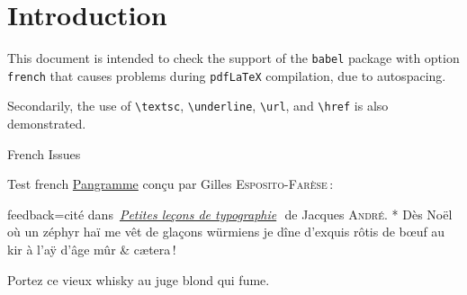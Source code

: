 \documentclass{article}
\def\myquestiontext{ \underline{Pangramme} conçu par Gilles 
  \textsc{Esposito-Farèse}:}
\def\pangramme{Dès Noël où un zéphyr haï me vêt de glaçons würmiens je dîne 
d’exquis rôtis de bœuf au kir à l’aÿ d’âge mûr \& cætera\,!}
\def\myfeedback{cité dans 
  \og\emph{\href{https://jacques-andre.fr/faqtypo/lessons.pdf}{Petites 
  leçons de typographie}}\fg\ de Jacques \textsc{André}.}
\def\myquestiontext{ \underline{Pangramme} con\c{c}u par Gilles 
  \textsc{Esposito-Far\`ese}\,:}
\def\pangramme{D\`es No\"el o\`u un z\'ephyr ha\"i me v\^et de 
gla\c{c}ons w\"urmiens je d\^ine d'exquis r\^otis de b\oe uf au kir \`a l'a\"y 
d'\^age m\^ur \& c\ae tera\,!}
\def\myfeedback{cit\'e dans 
\og\,\emph{\href{https://jacques-andre.fr/faqtypo/lessons.pdf}{Petites 
  le\c{c}ons de typographie}}\,\fg\ de Jacques \textsc{Andr\'e}.}
\begin{document}
\section*{Introduction}

This document is intended to check the support of the \texttt{babel} package 
with option \texttt{french} that causes problems during \texttt{pdfLaTeX} 
compilation, due to autospacing.

Secondarily, the use of \verb|\textsc|, \verb|\underline|, \verb|\url|, and 
\verb|\href| is also demonstrated.

\begin{quiz}[points=1]{French Issues}
\ifpdftex
  \NoAutoSpacing %
\fi
\begin{multi}[feedback={test}]{Test french}
\myquestiontext
\item[feedback={\myfeedback}]* \pangramme
\item Portez ce vieux whisky au juge blond qui fume.
\end{multi}

\end{quiz}
\end{document}
